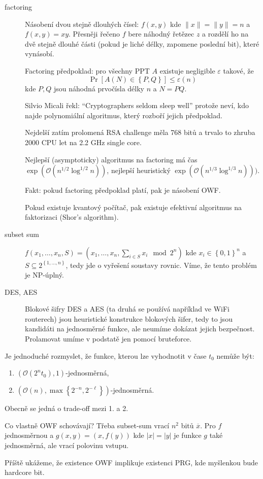 \documentclass[a4paper,12pt,titlepage]{article}
\def\definice{\noindent {\bf Definice: }}
\begin{document}
\begin{description}
	\item[factoring] 
			Násobení dvou stejně dlouhých čísel:
			$f(x,y)$ kde $\|x\| = \|y\| = n$ a $f(x,y) = xy$.
			Přesněji řečeno $f$ bere náhodný řetězec $z$ a rozdělí ho na dvě stejně dlouhé části (pokud je liché délky, zapomene poslední bit), které vynásobí.

			\definice Factoring předpoklad: pro všechny PPT $A$ existuje negligible $\varepsilon$ takové, že
			$$\Pr[A(N) \in \left\{ P, Q \right\}] \leq \varepsilon(n)$$
			kde $P,Q$ jsou náhodná prvočísla délky $n$ a $N = PQ$.

			Silvio Micali řekl: ``Cryptographers seldom sleep well'' protože neví, kdo najde polynomiální algoritmus, který rozboří jejich předpoklad.

			Nejdelší zatím prolomená RSA challenge měla 768 bitů a trvalo to zhruba 2000 CPU let na 2.2 GHz single core.

			Nejlepší (asymptoticky) algoritmus na factoring má čas $\exp(\mathcal{O}(n^{1/2} \log^{1/2}n))$, nejlepší heuristický $\exp(\mathcal{O}(n^{1/3} \log^{1/3}n)))$.

			Fakt: pokud factoring předpoklad platí, pak je násobení OWF.

			Pokud existuje kvantový počítač, pak existuje efektivní algoritmus na faktorizaci (Shor's algorithm).

		\item[subset sum]  $f(x_1, \dots, x_n, S) = (x_1, \dots, x_n, \sum_{i \in S} x_i \mod 2^n)$
			kde $x_i \in \left\{ 0,1 \right\}^n$ a $S \subseteq 2^{\left\{ 1, \dots, n \right\}}$, tedy jde o vyřešení soustavy rovnic.
			Víme, že tento problém je NP-úplný.

		\item[DES, AES]  Blokové šifry DES a AES (ta druhá se používá například ve WiFi routerech) jsou heuristické konstrukce blokových šifer, tedy to jsou kandidáti na jednosměrné funkce, ale neumíme dokázat jejich bezpečnost.
			Prolamovat umíme v podstatě jen pomocí bruteforce.
\end{description}

Je jednoduché rozmyslet, že funkce, kterou lze vyhodnotit v čase $t_0$ nemůže být:
\begin{enumerate}
	\item  $(\mathcal{O}(2^n t_0), 1)$-jednosměrná,
	\item  $(\mathcal{O}(n), \max\left\{ 2^{-n}, 2^{-\ell} \right\})$-jednosměrná.
\end{enumerate}
Obecně se jedná o trade-off mezi 1. a 2.

Co vlastně OWF schovávají?
Třeba subset-sum vrací $n^2$ bitů $\overline{x}$.
Pro $f$ jednosměrnou a $g(x,y) = (x, f(y))$ kde $|x| = |y|$ je funkce $g$ také jednosměrná, ale vrací polovinu vstupu.

Příště ukážeme, že existence OWF implikuje existenci PRG, kde myšlenkou bude hardcore bit.
\end{document}
